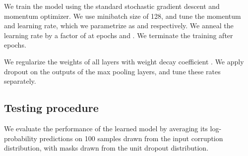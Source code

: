 \documentclass{article}
\begin{document}
We train the model using the standard stochastic gradient descent and momentum optimizer. We use minibatch size of 128, and tune the momentum and learning rate, which we parametrize as  and  respectively. We anneal the learning rate by a factor of  at epochs  and . We terminate the training after  epochs.

We regularize the weights of all layers with weight decay coefficient . We apply dropout on the outputs of the max pooling layers, and tune these rates  separately.

\subsection{Testing procedure}
We evaluate the performance of the learned model by averaging its log-probability predictions on 100 samples drawn from the input corruption distribution, with masks drawn from the unit dropout distribution.
\end{document}
